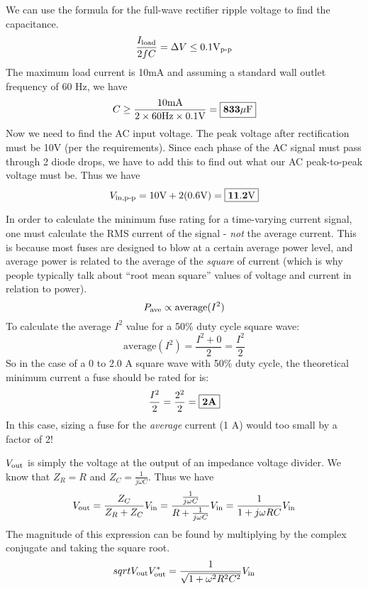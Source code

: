 \documentclass{article}
\begin{document}
    We can use the formula for the full-wave rectifier ripple voltage to find the capacitance.
    \[\frac{I_{\text{load}}}{2fC} = \Delta V \le 0.1 \text{V}_{\text{p-p}}\]
    The maximum load current is 10mA and assuming a standard wall outlet frequency of 60 Hz, we have
    \[C \ge \frac{10\text{m}\text{A}}{2\times 60\text{Hz} \times 0.1\text{V}} = \boxed{\mathbf{833 \mu\text{F}}}\]
    Now we need to find the AC input voltage. The peak voltage after rectification must be 10V (per the requirements). Since each phase of the AC signal must pass through 2 diode drops, we have to add this to find out what our AC peak-to-peak voltage must be. Thus we have
    \[V_{\text{in}, \text{p-p}} = 10\text{V} + 2(0.6\text{V}) = \boxed{\mathbf{11.2\text{V}}}\]


    In order to calculate the minimum fuse rating for a time-varying current signal, one must calculate the RMS current of the signal - \emph{not} the average current.  This is because most fuses are designed to blow at a certain average power level, and average power is related to the average of the \textit{square} of current (which is why people typically talk about ``root mean square'' values of voltage and current in relation to power).
    \[P_{\text{ave}} \propto \text{average}(I^2)\]
    To calculate the average $I^2$ value for a 50\% duty cycle square wave:
    \[ \text{average}(I^2) = \frac{I^2 + 0}{2} = \frac{I^2}{2}\]
    So in the case of a 0 to 2.0 A square wave with 50\% duty cycle, the theoretical minimum current a fuse should be rated for is:
    \[\frac{I^2}{2} = \frac{2^2}{2} = \boxed{\mathbf{2 A}}\]
    In this case, sizing a fuse for the \textit{average} current (1 A) would too small by a factor of 2!
    
    
    $V_{\text{out}}$ is simply the voltage at the output of an impedance voltage divider. We know that $Z_R = R$ and $Z_C = \frac{1}{j\omega C}$. Thus we have 
    \[V_{\text{out}} = \frac{Z_C}{Z_R + Z_C} V_{\text{in}} = \frac{\frac{1}{j \omega C}}{R + \frac{1}{j \omega C}} V_{\text{in}} = \frac{1}{1 + j \omega R C} V_{\text{in}}\]
    The magnitude of this expression can be found by multiplying by the complex conjugate and taking the square root.
    \[sqrt{V_{\text{out}} V_{\text{out}}^*} = \frac{1}{\sqrt{1 + \omega^2R^2C^2}}V_{\text{in}}\]
    
\end{document}

